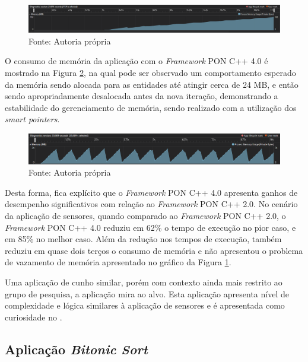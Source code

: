 \begin{figure}[!htb]
\centering
\caption{Consumo de memória \textit{Framework} PON C++ 2.0}
\includegraphics[width=\textwidth]{../figures/fw2_mem.png}
\smallskip
\caption*{Fonte: Autoria própria}
\label{fig:fw2_mem}
\end{figure}

O consumo de memória da aplicação com o \textit{Framework} PON C++ 4.0 é
mostrado na Figura \ref{fig:fw4_mem}, na qual pode ser observado um
comportamento esperado da memória sendo alocada para as entidades até atingir
cerca de 24 MB, e então sendo apropriadamente desalocada antes da nova iteração,
demonstrando a estabilidade do gerenciamento de memória, sendo realizado com a
utilização dos \textit{smart pointers}.

\begin{figure}[!htb]
\centering
\caption{Consumo de memória \textit{Framework} PON C++ 4.0}
\includegraphics[width=\textwidth]{../figures/fw4_mem.png}
\smallskip
\caption*{Fonte: Autoria própria}
\label{fig:fw4_mem}
\end{figure}

Desta forma, fica explícito que o \textit{Framework} PON C++ 4.0 apresenta
ganhos de desempenho significativos com relação ao \textit{Framework} PON C++
2.0. No cenário da aplicação de sensores, quando comparado ao \textit{Framework}
PON C++ 2.0, o \textit{Framework} PON C++ 4.0 reduziu em 62\% o tempo de
execução no pior caso, e em 85\% no melhor caso. Além da redução nos tempos de
execução, também reduziu em quase dois terços o consumo de memória e não
apresentou o problema de vazamento de memória apresentado no gráfico da Figura
\ref{fig:fw2_mem}.

Uma aplicação de cunho similar, porém com contexto ainda mais restrito ao grupo
de pesquisa, a aplicação mira ao alvo. Esta aplicação apresenta nível de
complexidade e lógica similares à aplicação de sensores e é apresentada como
curiosidade no .

\subsection{Aplicação \textit{Bitonic Sort}}\label{sec:bitonic_sort}


